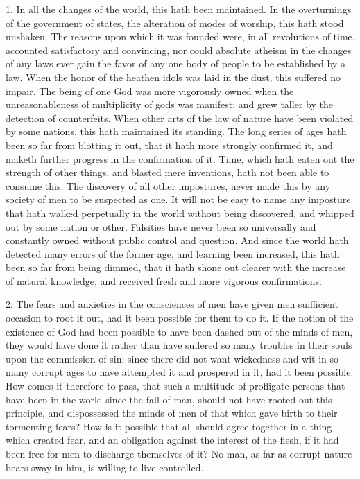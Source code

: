\documentclass[a5paper]{book}
\begin{document}
1. In all the changes of the world, this hath been maintained. 
In the overturnings of the government of states, 
    the alteration of modes of worship, 
    this hath stood unshaken. 
The reasons upon which it was founded were, in all revolutions of time, 
    accounted satisfactory and convincing, 
    nor could absolute atheism in the changes of any laws 
    ever gain the favor of any one body of people to be established by a law. 
When the honor of the heathen idols was laid in the dust, 
    this suffered no impair. 
The being of one God was more vigorously owned when 
    the unreasonableness of multiplicity of gods was manifest; 
    and grew taller by the detection of counterfeits. 
When other arts of the law of nature have been violated by some nations, 
    this hath maintained its standing. 
The long series of ages hath been so far from blotting it out, 
    that it hath more strongly confirmed it, 
    and maketh further progress in the confirmation of it. 
Time, which hath eaten out the strength of other things, 
    and blasted mere inventions, hath not been able to consume this. 
The discovery of all other impostures, 
    never made this by any society of men to be suspected as one. 
It will not be easy to name any imposture that hath walked 
    perpetually in the world without being discovered, 
    and whipped out by some nation or other. 
Falsities have never been so universally and constantly owned 
    without public control and question. 
And since the world hath detected many errors of the former age, 
    and learning been increased, this hath been so far from being dimmed,
    that it hath shone out clearer with the increase of natural knowledge,
    and received fresh and more vigorous confirmations.

2. The fears and anxieties in the consciences of men have given
    men suifficient occasion to root it out, 
    had it been possible for them to do it. 
If the notion of the existence of God had been possible 
    to have been dashed out of the minds of men, 
    they would have done it rather than have suffered 
    so many troubles in their souls upon the commission of sin; 
    since there did not want wickedness and wit 
    in so many corrupt ages to have attempted it and prospered in it, 
    had it been possible. 
How comes it therefore to pass, 
    that such a multitude of profligate persons that have been in the world 
    since the fall of man, 
    should not have rooted out this principle, 
    and dispossessed the minds of men of that which gave birth 
    to their tormenting fears?
How is it possible that all should agree together in a thing which created fear, 
    and an obligation against the interest of the flesh, 
    if it had been free for men to discharge themselves of it? 
    No man, as far as corrupt nature bears sway in him, 
    is willing to live controlled.
\end{document}
